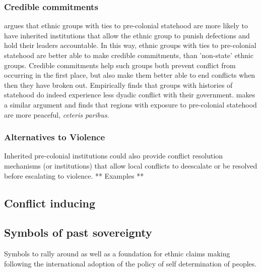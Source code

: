 \documentclass[12pt]{article}
\begin{document}

\subsubsection{Credible commitments}

\citet{Wig2016} argues that ethnic groups with ties to pre-colonial statehood
are more likely to have inherited institutions that allow the ethnic group to
punish defections and hold their leaders accountable.  In this way, ethnic
groups with ties to pre-colonial statehood are better able to make credible
commitments, than 'non-state' ethnic groups.  Credible commitments help such
groups both prevent conflict from occurring in the first place, but also make
them better able to end conflicts when then they have broken out.  Empirically
\citet{Wig2016} finds that groups with histories of statehood do indeed
experience less dyadic conflict with their government.
\citet{Depetris-Chauvin2016} makes a similar argument and finds that regions
with exposure to pre-colonial statehood are more peaceful, \textit{ceteris
paribus}.

\subsubsection{Alternatives to Violence}

Inherited pre-colonial institutions could also provide conflict resolution
mechanisms (or institutions) that allow local conflicts to deescalate or be
resolved before escalating to violence. ** Examples **


\subsection{Conflict inducing}

\subsection{Symbols of past sovereignty}

Symbols to rally around as well as a foundation for ethnic claims making
following the international adoption of the policy of self determination of
peoples.
\end{document}
